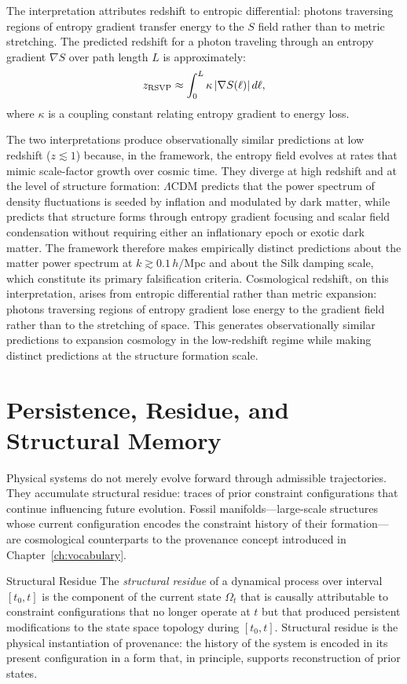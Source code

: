 The \RSVP interpretation attributes redshift to entropic differential: photons
traversing regions of entropy gradient transfer energy to the $S$ field rather
than to metric stretching. The predicted redshift for a photon traveling through
an entropy gradient $\nabla S$ over path length $L$ is approximately:
\[
  z_{\rm RSVP} \approx \int_0^L \kappa\,|\nabla S(\ell)|\,d\ell,
\]
where $\kappa$ is a coupling constant relating entropy gradient to energy loss.

The two interpretations produce observationally similar predictions at low redshift
($z \lesssim 1$) because, in the \RSVP framework, the entropy field evolves at
rates that mimic scale-factor growth over cosmic time. They diverge at high
redshift and at the level of structure formation: $\Lambda$CDM predicts that the
power spectrum of density fluctuations is seeded by inflation and modulated by
dark matter, while \RSVP predicts that structure forms through entropy gradient
focusing and scalar field condensation without requiring either an inflationary
epoch or exotic dark matter. The \RSVP framework therefore makes empirically
distinct predictions about the matter power spectrum at $k \gtrsim 0.1\,h/$Mpc
and about the Silk damping scale, which constitute its primary falsification
criteria. Cosmological redshift, on this interpretation, arises
from entropic differential rather than metric expansion: photons traversing regions
of entropy gradient lose energy to the gradient field rather than to the stretching
of space. This generates observationally similar predictions to expansion cosmology
in the low-redshift regime while making distinct predictions at the structure
formation scale.

\section{Persistence, Residue, and Structural Memory}

Physical systems do not merely evolve forward through admissible trajectories.
They accumulate structural residue: traces of prior constraint configurations that
continue influencing future evolution. Fossil manifolds---large-scale structures
whose current configuration encodes the constraint history of their formation---are
cosmological counterparts to the provenance concept introduced in
Chapter~\ref{ch:vocabulary}.

\begin{definition}{Structural Residue}
The \emph{structural residue} of a dynamical process over interval $[t_0, t]$ is
the component of the current state $\Omega_t$ that is causally attributable to
constraint configurations that no longer operate at $t$ but that produced persistent
modifications to the state space topology during $[t_0, t]$. Structural residue is
the physical instantiation of provenance: the history of the system is encoded in
its present configuration in a form that, in principle, supports reconstruction of
prior states.
\end{definition}

